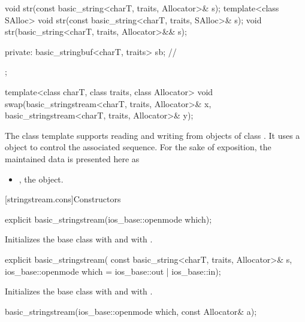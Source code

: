 \begin{codeblock}
{{    void str(const basic_string<charT, traits, Allocator>& s);
    template<class SAlloc>
      void str(const basic_string<charT, traits, SAlloc>& s);
    void str(basic_string<charT, traits, Allocator>&& s);

  private:
    basic_stringbuf<charT, traits> sb;  // \expos
  };

  template<class charT, class traits, class Allocator>
    void swap(basic_stringstream<charT, traits, Allocator>& x,
              basic_stringstream<charT, traits, Allocator>& y);
}
\end{codeblock}

\pnum
The
class template
supports reading and writing from objects of class
.
It uses a
object to control the associated sequence.
For the sake of exposition, the maintained data is presented here as
\begin{itemize}
\item
{}, the  object.
\end{itemize}

[stringstream.cons]{Constructors}

%
\begin{itemdecl}
explicit basic_stringstream(ios_base::openmode which);
\end{itemdecl}

\begin{itemdescr}
\pnum
\effects
Initializes the base class with
and
with
.
\end{itemdescr}

%
\begin{itemdecl}
explicit basic_stringstream(
  const basic_string<charT, traits, Allocator>& s,
  ios_base::openmode which = ios_base::out | ios_base::in);
\end{itemdecl}

\begin{itemdescr}
\pnum
\effects
Initializes the base class with
and
with
.
\end{itemdescr}

%
\begin{itemdecl}
basic_stringstream(ios_base::openmode which, const Allocator& a);
\end{itemdecl}

